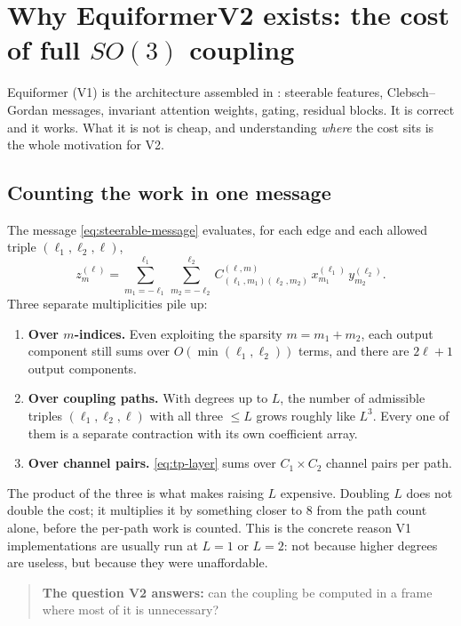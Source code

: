 \documentclass[11pt,a4paper]{report}
\theoremstyle{definition}
\theoremstyle{remark}
\begin{document}
\section{Why EquiformerV2 exists: the cost of full \texorpdfstring{$SO(3)$}{SO(3)} coupling}
\label{sec:v1-to-v2}

Equiformer (V1) is the architecture assembled in
: steerable
features, Clebsch--Gordan messages, invariant attention weights, gating,
residual blocks. It is correct and it works. What it is not is cheap, and
understanding \emph{where} the cost sits is the whole motivation for V2.

\subsection{Counting the work in one message}

The message \eqref{eq:steerable-message} evaluates, for each edge and each
allowed triple $(\ell_1,\ell_2,\ell)$,
\[
z^{(\ell)}_m=\sum_{m_1=-\ell_1}^{\ell_1}\sum_{m_2=-\ell_2}^{\ell_2}
C^{(\ell,m)}_{(\ell_1,m_1)(\ell_2,m_2)}\,x^{(\ell_1)}_{m_1}\,y^{(\ell_2)}_{m_2} .
\]
Three separate multiplicities pile up:

\begin{enumerate}
\item \textbf{Over $m$-indices.} Even exploiting the sparsity
$m=m_1+m_2$, each output component still sums over $O(\min(\ell_1,\ell_2))$
terms, and there are $2\ell+1$ output components.
\item \textbf{Over coupling paths.} With degrees up to $L$, the number of
admissible triples $(\ell_1,\ell_2,\ell)$ with all three $\le L$ grows
roughly like $L^3$. Every one of them is a separate contraction with its own
coefficient array.
\item \textbf{Over channel pairs.} \eqref{eq:tp-layer} sums over
$C_1\times C_2$ channel pairs per path.
\end{enumerate}

The product of the three is what makes raising $L$ expensive. Doubling $L$
does not double the cost; it multiplies it by something closer to $8$ from
the path count alone, before the per-path work is counted. This is the
concrete reason V1 implementations are usually run at $L=1$ or $L=2$: not
because higher degrees are useless, but because they were unaffordable.

\begin{quote}
\textbf{The question V2 answers:} can the coupling be computed in a frame
where most of it is unnecessary?
\end{quote}
\end{document}
